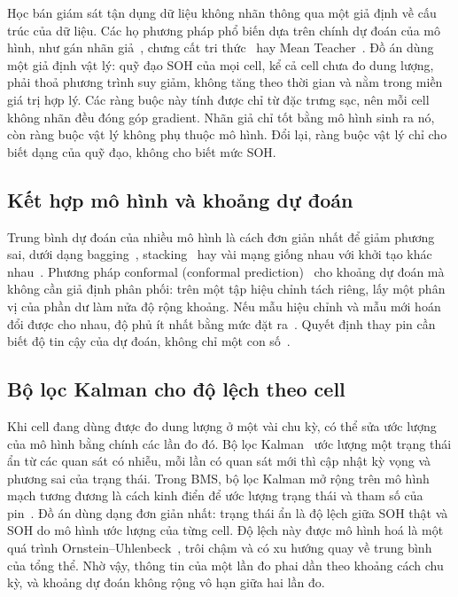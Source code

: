 Học bán giám sát tận dụng dữ liệu không nhãn thông qua một giả định về cấu trúc của dữ liệu. Các họ phương pháp phổ biến
dựa trên chính dự đoán của mô hình, như gán nhãn giả~\cite{lee2013}, chưng cất tri thức~\cite{hinton2015} hay Mean
Teacher~\cite{tarvainen2017}. Đồ án dùng một giả định vật lý: quỹ đạo SOH của mọi cell, kể cả cell chưa đo dung lượng,
phải thoả phương trình suy giảm, không tăng theo thời gian và nằm trong miền giá trị hợp lý. Các ràng buộc này tính được
chỉ từ đặc trưng sạc, nên mỗi cell không nhãn đều đóng góp gradient. Nhãn giả chỉ tốt bằng mô hình sinh ra nó, còn ràng
buộc vật lý không phụ thuộc mô hình. Đổi lại, ràng buộc vật lý chỉ cho biết dạng của quỹ đạo, không cho biết mức SOH.

\subsection{Kết hợp mô hình và khoảng dự đoán}

Trung bình dự đoán của nhiều mô hình là cách đơn giản nhất để giảm phương sai, dưới dạng bagging~\cite{breiman1996},
stacking~\cite{wolpert1992} hay vài mạng giống nhau với khởi tạo khác nhau~\cite{lakshminarayanan2017}. Phương pháp
conformal (conformal prediction)~\cite{vovk2005,lei2018} cho khoảng dự đoán mà không cần giả định phân phối: trên một tập
hiệu chỉnh tách riêng, lấy một phân vị của phần dư làm nửa độ rộng khoảng. Nếu mẫu hiệu chỉnh và mẫu mới hoán đổi được cho
nhau, độ phủ ít nhất bằng mức đặt ra~\cite{angelopoulos2023}. Quyết định thay pin cần biết độ tin cậy của dự đoán, không
chỉ một con số~\cite{thelen2024}.

\subsection{Bộ lọc Kalman cho độ lệch theo cell}\label{sec:lt_kalman}

Khi cell đang dùng được đo dung lượng ở một vài chu kỳ, có thể sửa ước lượng của mô hình bằng chính các lần đo đó. Bộ lọc
Kalman~\cite{kalman1960} ước lượng một trạng thái ẩn từ các quan sát có nhiễu, mỗi lần có quan sát mới thì cập nhật kỳ
vọng và phương sai của trạng thái. Trong BMS, bộ lọc Kalman mở rộng trên mô hình mạch tương đương là cách kinh điển để
ước lượng trạng thái và tham số của pin~\cite{plett2004}. Đồ án dùng dạng đơn giản nhất: trạng thái ẩn là độ lệch giữa
SOH thật và SOH do mô hình ước lượng của từng cell. Độ lệch này được mô hình hoá là một quá trình
Ornstein--Uhlenbeck~\cite{uhlenbeck1930}, trôi chậm và có xu hướng quay về trung bình của tổng thể. Nhờ vậy, thông tin
của một lần đo phai dần theo khoảng cách chu kỳ, và khoảng dự đoán không rộng vô hạn giữa hai lần đo.

